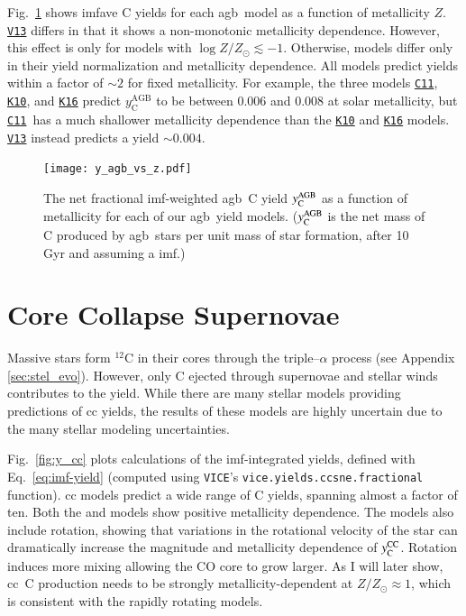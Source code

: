 \documentclass[12pt,oneside,letterpaper]{report}
\newcommand{\cc}{\gls{cc}}
\newcommand{\agb}{\gls{agb}}
\newcommand{\imf}{\gls{imf}}
\newcommand{\cxi}{\texttt{\hyperlink{C11}{C11}}}
\newcommand{\kx}{\texttt{\hyperlink{K10}{K10}}}
\newcommand{\kxvi}{\texttt{\hyperlink{K16}{K16}}}
\newcommand{\vxiii}{\texttt{\hyperlink{V13}{V13}}}
\newcommand{\VICE}{\texttt{VICE}}
\newcommand{\Ycc}{\ensuremath{y_{\rm C}^{\rm CC}}}
\newcommand{\Ycagb}{\ensuremath{y_{\rm C}^{\rm AGB}}}
\newcommand{\about}[1]{${\sim} #1$}
\begin{document}
Fig.~\ref{fig:yagb-z} shows \gls{imfave} C yields for each \agb\ model as a function of metallicity $Z$.
\vxiii{} differs in that it shows a non-monotonic metallicity dependence. However, this effect is only for models with $\log Z/Z_\odot \lesssim -1$.
Otherwise, models differ only in their yield normalization and metallicity dependence. All models predict yields within a factor of \about{2} for fixed metallicity.
For example, the three models \cxi, \kx{}, and \kxvi{} predict $y_\text{C}^\text{AGB}$ to be between 0.006 and 0.008 at solar metallicity, but \cxi\ has a much shallower metallicity dependence than the \kx{} and \kxvi{} models. \vxiii{} instead predicts a yield \about{0.004}.

\begin{figure}[htp]
    \centering
    \texttt{[image: y\_agb\_vs\_z.pdf]}

    \caption[Low-Mass-Star Yield Metallicity Dependence]{The net fractional \imf-weighted \agb\ C yield $\Ycagb$ as a function of metallicity for each of our \agb\ yield models. ($\Ycagb$ is the net mass of C produced by \agb\ stars per unit mass of star formation, after 10\,Gyr and assuming a \citealt{kroupa01} \imf.)
    }
    \label{fig:yagb-z}
\end{figure}

\section{Core Collapse Supernovae}


Massive stars form $^{12}$C in their cores through the triple--$\alpha$ process (see Appendix \ref{sec:stel_evo}). However, only C ejected through supernovae and stellar winds contributes to the yield. 
While there are many stellar models providing predictions of \cc{} yields, the results of these models are highly uncertain due to the many stellar modeling uncertainties. 

Fig.~\ref{fig:y_cc} plots calculations of the \imf-integrated yields, defined with Eq.~\ref{eq:imf-yield} (computed using \VICE's \texttt{vice.yields.ccsne.fractional} function). 
\Gls{cc} models predict a wide range of C yields, spanning almost a factor of ten. 
Both the \citet{NKT13} and \cite{LC18} models show positive metallicity dependence. 
The \cite{LC18} models also include rotation, showing that variations in the rotational velocity of the star can dramatically increase the magnitude and metallicity dependence of $\Ycc$. Rotation induces more mixing allowing the CO core to grow larger. As I will later show, \cc\ C production needs to be strongly metallicity-dependent at $Z/Z_\odot \approx 1$, which is consistent with the \cite{LC18} rapidly rotating models.
\end{document}
